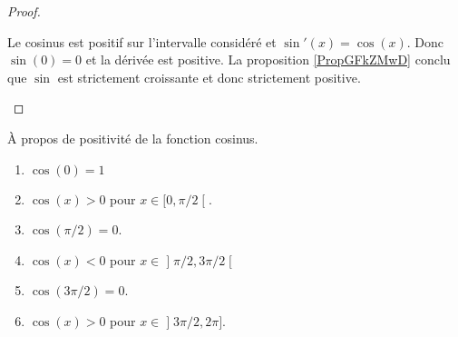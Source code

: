 \begin{proof}
\begin{enumerate}
        Le cosinus est positif sur l'intervalle considéré et \( \sin'(x)=\cos(x)\). Donc \( \sin(0)=0\) et la dérivée est positive. La proposition \ref{PropGFkZMwD} conclu que \( \sin\) est strictement croissante et donc strictement positive.
    \end{enumerate}
\end{proof}

\begin{lemma}      \label{LEMooFESYooBoiuol}
    À propos de positivité de la fonction cosinus.
    \begin{enumerate}
        \item       \label{ITEMooIXSDooJyCQyb}
            \( \cos(0)=1\)
        \item       \label{ITEMooWJEVooGZykbO}
            \( \cos(x)>0\) pour \( x\in\mathopen[ 0 , \pi/2 \mathclose[\).
            \item       \label{ITEMooANEPooLGmYtc}
                \( \cos(\pi/2)=0\).
            \item       \label{ITEMooRDWJooZXWyfv}
            \( \cos(x)<0\) pour \( x\in \mathopen] \pi/2 , 3\pi/2 \mathclose[\)
            \item       \label{ITEMooFKPAooBNlvPU}
                \( \cos(3\pi/2)=0\).
            \item       \label{ITEMooIDZGooBTDvDF}
            \( \cos(x)>0\) pour \( x\in\mathopen] 3\pi/2 , 2\pi \mathclose]\).
    \end{enumerate}
\end{lemma}

